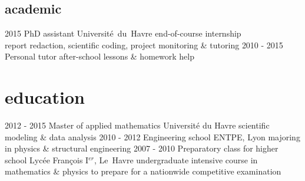 \documentclass[a4paper]{farangoth-cv}
\begin{document}
\subsection{academic}
\begin{entrylist}
  \entry%
  {2015}
  {PhD assistant}
  {\mbox{Université du Havre}}
  {%
    end-of-course internship\\
    report redaction, scientific coding, project monitoring \& tutoring
  }
  \entry%
  {2010 \-- 2015}
  {Personal tutor}
  {}
  {%
    after-school lessons \& homework help
  }
\end{entrylist}



\section{education}
\begin{entrylist}
  \entry%
  {2012 \-- 2015}
  {Master of applied mathematics}
  {Université du Havre}
  {%
    scientific modeling \& data analysis
  }
  \entry%
  {2010 \-- 2012}
  {Engineering school}
  {ENTPE, Lyon}
  {%
    majoring in physics \& structural engineering
  }
  \entry%
  {2007 \-- 2010}
  {Preparatory class for higher school}
  {Lycée François I$^{er}$, \mbox{Le Havre}}
  {%
    undergraduate intensive course in mathematics \& physics to prepare for a nationwide competitive examination
  }
\end{entrylist}

\makefooterUK{}
\end{document}
